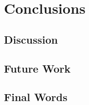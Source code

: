 \section{Conclusions }

\subsection{Discussion}


\subsection{Future Work}

\subsection{Final Words}

